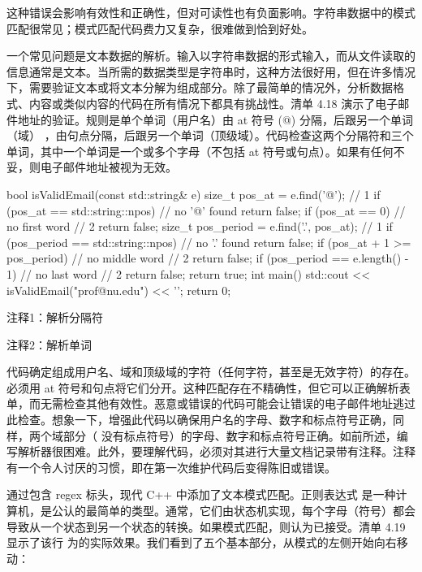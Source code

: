 这种错误会影响有效性和正确性，但对可读性也有负面影响。字符串数据中的模式匹配很常见；模式匹配代码费力又复杂，很难做到恰到好处。


一个常见问题是文本数据的解析。输入以字符串数据的形式输入，而从文件读取的信息通常是文本。当所需的数据类型是字符串时，这种方法很好用，但在许多情况下，需要验证文本或将文本分解为组成部分。除了最简单的情况外，分析数据格式、内容或类似内容的代码在所有情况下都具有挑战性。清单 4.18 演示了电子邮件地址的验证。规则是单个单词（用户名）由 at 符号 (@) 分隔，后跟另一个单词（域） ，由句点分隔，后跟另一个单词（顶级域）。代码检查这两个分隔符和三个单词，其中一个单词是一个或多个字母（不包括 at 符号或句点）。如果有任何不妥，则电子邮件地址被视为无效。


\begin{cpp}
bool isValidEmail(const std::string& e) {
  size_t pos_at = e.find('@'); // 1
  if (pos_at == std::string::npos) // no '@' found
  return false;
  if (pos_at == 0) // no first word // 2
    return false;
  size_t pos_period = e.find('.', pos_at); // 1
  if (pos_period == std::string::npos) // no '.' found
    return false;
  if (pos_at + 1 >= pos_period) // no middle word // 2
    return false;
  if (pos_period == e.length() - 1) // no last word // 2
    return false;
  return true;
}
int main() {
  std::cout << isValidEmail("prof@nu.edu") << '\n';
  return 0;
}
\end{cpp}

{\footnotesize
注释1：解析分隔符

注释2：解析单词
}


代码确定组成用户名、域和顶级域的字符（任何字符，甚至是无效字符）的存在。必须用 at 符号和句点将它们分开。这种匹配存在不精确性，但它可以正确解析表单，而无需检查其他有效性。恶意或错误的代码可能会让错误的电子邮件地址逃过此检查。想象一下，增强此代码以确保用户名的字母、数字和标点符号正确，同样，两个域部分（ 没有标点符号）的字母、数字和标点符号正确。如前所述，编写解析器很困难。此外，要理解代码，必须对其进行大量文档记录带有注释。注释有一个令人讨厌的习惯，即在第一次维护代码后变得陈旧或错误。


通过包含 regex 标头，现代 C++ 中添加了文本模式匹配。正则表达式 是一种计算机，是公认的最简单的类型。通常，它们由状态机实现，每个字母（符号）都会导致从一个状态到另一个状态的转换。如果模式匹配，则认为已接受。清单 4.19 显示了该行 为的实际效果。我们看到了五个基本部分，从模式的左侧开始向右移动：

